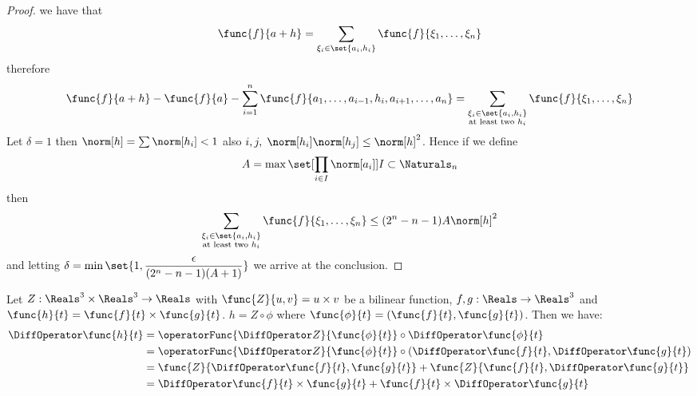 \begin{proof}
    we have that
    \begin{equation*}
        \func{f}{a + h} = \sum_{\xi_i \in \set{a_i,h_i}} \func{f}{\xi_1, \dots , \xi_n}
    \end{equation*}
    therefore
    \begin{equation*}
        \func{f}{a + h} - \func{f}{a} - \sum_{i = 1}^{n} \func{f}{a_1, \dots, a_{i-1}, h_i, a_{i+1}, \dots , a_n} = \sum_{\substack{\xi_i \in \set{a_i,h_i} \\ \text{at least two \(h_i\)}}} \func{f}{\xi_1, \dots , \xi_n}
    \end{equation*}
    Let \(\delta = 1\) then  \(\norm[h] = \sum \norm[h_i] < 1\) also \(i,j, \; \norm[h_i]\norm[h_j] \leq \norm[h]^2\). Hence if we define
    \begin{equation*}
        A = \max \set[\prod_{i \in I} \norm[a_i]]{I \subset \Naturals_n}
    \end{equation*}
    then
    \begin{equation*}
        \sum_{\substack{\xi_i \in \set{a_i,h_i} \\ \text{at least two \(h_i\)}}} \func{f}{\xi_1, \dots , \xi_n} \leq (2^n - n - 1)A \norm[h]^2
    \end{equation*}
    and letting \(\delta = \min \set{1 , \dfrac{\epsilon}{(2^n - n - 1)(A + 1)}}\) we arrive at the conclusion.
\end{proof}

\begin{example}
    Let \(Z: \Reals^3 \times \Reals^3 \to \Reals\) with \(\func{Z}{u,v}= u \times v\) be a bilinear function, \(f,g: \Reals \to \Reals^3\) and \(\func{h}{t} = \func{f}{t} \times \func{g}{t}\). \(h = Z \circ \phi\) where \(\func{\phi}{t} = (\func{f}{t},\func{g}{t})\). Then we have:
    \begin{align*}
        \DiffOperator \func{h}{t} & = \operatorFunc{\DiffOperator Z}{\func{\phi}{t}}\circ \DiffOperator \func{\phi}{t}                             \\
                                  & =  \operatorFunc{\DiffOperator Z}{\func{\phi}{t}} \circ (\DiffOperator \func{f}{t}, \DiffOperator \func{g}{t}) \\
                                  & = \func{Z}{\DiffOperator \func{f}{t}, \func{g}{t}} + \func{Z}{ \func{f}{t}, \DiffOperator \func{g}{t}}         \\
                                  & = \DiffOperator \func{f}{t} \times \func{g}{t} + \func{f}{t} \times \DiffOperator \func{g}{t}
    \end{align*}
\end{example}

